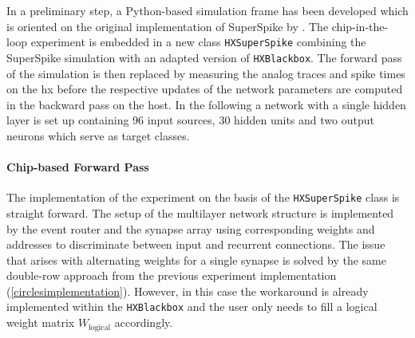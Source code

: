 In a preliminary step, a Python-based simulation frame has been developed which is oriented on the original implementation of SuperSpike by \cite{zenke2018superspike}. The chip-in-the-loop experiment is embedded in a new class \texttt{HXSuperSpike} combining the SuperSpike simulation with an adapted version of \texttt{HXBlackbox}. The forward pass of the simulation is then replaced by measuring the analog traces and spike times on the \gls{hx} before the respective updates of the network parameters are computed in the backward pass on the host. In the following a network with a single hidden layer is set up containing 96 input sources, 30 hidden units and two output neurons which serve as target classes.


\paragraph{Chip-based Forward Pass}
The implementation of the experiment on the basis of the \texttt{HXSuperSpike} class is straight forward. The setup of the multilayer network structure is implemented by the event router and the synapse array using corresponding weights and addresses to discriminate between input and recurrent connections. The issue that arises with alternating weights for a single synapse is solved by the same double-row approach from the previous experiment implementation (\cref{circlesimplementation}). However, in this case the workaround is already implemented within the \texttt{HXBlackbox} and the user only needs to fill a logical weight matrix $W_\text{logical}$ accordingly.

